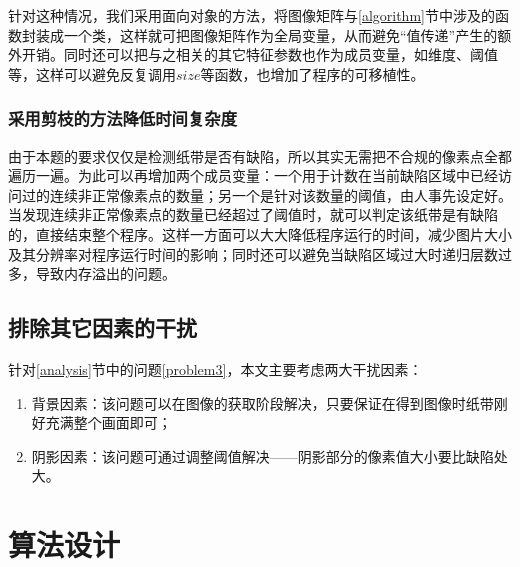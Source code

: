 \documentclass[UTF8]{ctexart}
\begin{document}
				\indent 针对这种情况，我们采用面向对象的方法，将图像矩阵与\ref{algorithm}节中涉及的函数封装成一个类，这样就可把图像矩阵作为全局变量，从而避免“值传递”产生的额外开销。同时还可以把与之相关的其它特征参数也作为成员变量，如维度、阈值等，这样可以避免反复调用$size$等函数，也增加了程序的可移植性。
				
			\subsubsection{采用剪枝的方法降低时间复杂度}
				
				\indent 由于本题的要求仅仅是检测纸带是否有缺陷，所以其实无需把不合规的像素点全都遍历一遍。为此可以再增加两个成员变量：一个用于计数在当前缺陷区域中已经访问过的连续非正常像素点的数量；另一个是针对该数量的阈值，由人事先设定好。当发现连续非正常像素点的数量已经超过了阈值时，就可以判定该纸带是有缺陷的，直接结束整个程序。这样一方面可以大大降低程序运行的时间，减少图片大小及其分辨率对程序运行时间的影响；同时还可以避免当缺陷区域过大时递归层数过多，导致内存溢出的问题。
				
		\subsection{排除其它因素的干扰}
			
			\indent 针对\ref{analysis}节中的问题\ref{problem3}，本文主要考虑两大干扰因素：
			\begin{enumerate}[leftmargin=50pt]
				\item 背景因素：该问题可以在图像的获取阶段解决，只要保证在得到图像时纸带刚好充满整个画面即可；
				\item 阴影因素：该问题可通过调整阈值解决——阴影部分的像素值大小要比缺陷处大。
			\end{enumerate}
	\section{算法设计}
\end{document}
